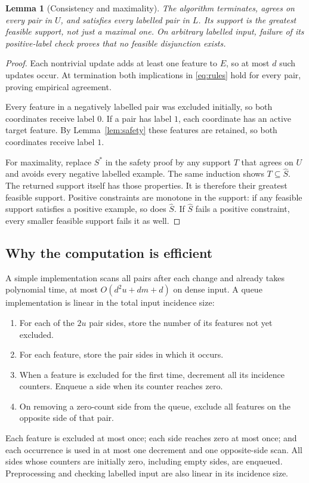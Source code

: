 \documentclass[11pt,a4paper]{article}
\newtheorem{lemma}[theorem]{Lemma}
\begin{document}
\begin{lemma}[Consistency and maximality]\label{lem:cons}
The algorithm terminates, agrees on every pair in \(U\), and satisfies every
labelled pair in \(L\). Its support is the greatest feasible support, not just
a maximal one. On arbitrary labelled input, failure of its positive-label
check proves that no feasible disjunction exists.
\end{lemma}

\begin{proof}
Each nontrivial update adds at least one feature to \(E\), so at most \(d\)
such updates occur. At termination both implications in \eqref{eq:rules}
hold for every pair, proving empirical agreement.

Every feature in a negatively labelled pair was excluded initially, so both
coordinates receive label \(0\). If a pair has label \(1\), each coordinate
has an active target feature. By Lemma~\ref{lem:safety} these features are
retained, so both coordinates receive label \(1\).

For maximality, replace \(S^*\) in the safety proof by any support \(T\)
that agrees on \(U\) and avoids every negative labelled example.
The same induction shows \(T\subseteq\widehat S\).
The returned support itself has those properties. It is therefore their
greatest feasible support. Positive constraints are monotone in the support:
if any feasible support satisfies a positive example, so does
\(\widehat S\). If \(\widehat S\) fails a positive constraint, every smaller
feasible support fails it as well.
\end{proof}

\subsection{Why the computation is efficient}

A simple implementation scans all pairs after each change and already
takes polynomial time, at most \(O(d^2u+dm+d)\) on dense input.
A queue implementation is linear in the total input incidence size:
\begin{enumerate}
\item For each of the \(2u\) pair sides, store the number of its features not
yet excluded.
\item For each feature, store the pair sides in which it occurs.
\item When a feature is excluded for the first time, decrement all its
incidence counters. Enqueue a side when its counter reaches zero.
\item On removing a zero-count side from the queue, exclude all features
on the opposite side of that pair.
\end{enumerate}
Each feature is excluded at most once; each side reaches zero at most once;
and each occurrence is used in at most one decrement and one opposite-side
scan. All sides whose counters are initially zero, including empty sides,
are enqueued. Preprocessing and checking
labelled input are also linear in its incidence size.
\end{document}
